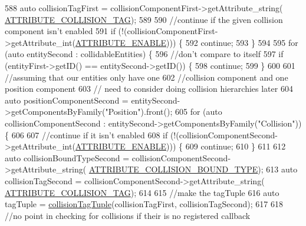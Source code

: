 \begin{DoxyCode}
588         \textcolor{keyword}{auto} collisionTagFirst = collisionComponentFirst->getAttribute\_string(
      \hyperlink{_a_e___attributes_8h_a26b14cbbf2e63e42061d132e25412f59}{ATTRIBUTE\_COLLISION\_TAG});
589 
590         \textcolor{comment}{//continue if the given collision component isn't enabled}
591         \textcolor{keywordflow}{if} (!(collisionComponentFirst->getAttribute\_int(\hyperlink{_a_e___attributes_8h_a4c775095baf8a9c99621ad9ad3b622db}{ATTRIBUTE\_ENABLE}))) \{
592             \textcolor{keywordflow}{continue};
593         \}
594 
595         \textcolor{keywordflow}{for} (\textcolor{keyword}{auto} entitySecond : collidableEntities) \{
596             \textcolor{comment}{//don't compare to itself}
597             \textcolor{keywordflow}{if} (entityFirst->getID() == entitySecond->getID()) \{
598                 \textcolor{keywordflow}{continue};
599             \}
600 
601             \textcolor{comment}{//assuming that our entities only have one}
602             \textcolor{comment}{//collision component and one position component}
603             \textcolor{comment}{//  need to consider doing collision hierarchies later}
604             \textcolor{keyword}{auto} positionComponentSecond = entitySecond->getComponentsByFamily(\textcolor{stringliteral}{"Position"}).front();
605             \textcolor{keywordflow}{for} (\textcolor{keyword}{auto} collisionComponentSecond : entitySecond->getComponentsByFamily(\textcolor{stringliteral}{"Collision"})) \{
606 
607             \textcolor{comment}{//continue if it isn't enabled}
608             \textcolor{keywordflow}{if} (!(collisionComponentSecond->getAttribute\_int(\hyperlink{_a_e___attributes_8h_a4c775095baf8a9c99621ad9ad3b622db}{ATTRIBUTE\_ENABLE}))) \{
609                 \textcolor{keywordflow}{continue};
610             \}
611 
612             \textcolor{keyword}{auto} collisionBoundTypeSecond = collisionComponentSecond->getAttribute\_string(
      \hyperlink{_a_e___attributes_8h_a22ab960bb5b8b4b1350c7a25cadc49a5}{ATTRIBUTE\_COLLISION\_BOUND\_TYPE});
613             \textcolor{keyword}{auto} collisionTagSecond = collisionComponentSecond->getAttribute\_string(
      \hyperlink{_a_e___attributes_8h_a26b14cbbf2e63e42061d132e25412f59}{ATTRIBUTE\_COLLISION\_TAG});
614 
615             \textcolor{comment}{//make the tagTuple}
616             \textcolor{keyword}{auto} tagTuple = \hyperlink{_collision_manager_8h_a59fec3c97983b1c074529cfdd245515a}{collisionTagTuple}(collisionTagFirst, collisionTagSecond);
617 
618             \textcolor{comment}{//no point in checking for collisions if their is no registered callback}

\end{DoxyCode}
